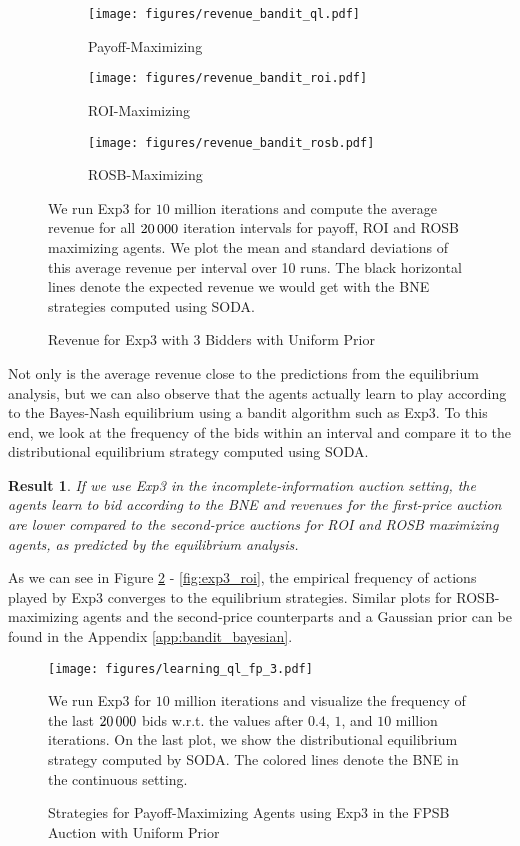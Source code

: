 \documentclass{article}
\newtheorem{result}{Result}
\begin{document}
\begin{figure}[h]
	\begin{center}
		\begin{subfigure}{0.32\textwidth}
			\centering
			\texttt{[image: figures/revenue\_bandit\_ql.pdf]}
			\caption{Payoff-Maximizing}
		\end{subfigure}
		\begin{subfigure}{0.32\textwidth}
			\centering
			\texttt{[image: figures/revenue\_bandit\_roi.pdf]}
			\caption{ROI-Maximizing}
		\end{subfigure}
		\begin{subfigure}{0.32\textwidth}
			\centering
			\texttt{[image: figures/revenue\_bandit\_rosb.pdf]}
			\caption{ROSB-Maximizing}
		\end{subfigure}
		\caption{Revenue for Exp3 with 3 Bidders with Uniform Prior}
		\label{fig:exp3_incomplete}
	\end{center}
	\footnotesize
	We run Exp3 for $10$ million iterations and compute the average revenue for all $20\thinspace000$ iteration intervals for payoff, ROI and ROSB maximizing agents. We plot the mean and standard deviations of this average revenue per interval over 10 runs. The black horizontal lines denote the expected revenue we would get with the BNE strategies computed using SODA.
\end{figure}

Not only is the average revenue close to the predictions from the equilibrium analysis, but we can also observe that the agents actually learn to play according to the Bayes-Nash equilibrium using a bandit algorithm such as Exp3. 
To this end, we look at the frequency of the bids within an interval and compare it to the distributional equilibrium strategy computed using SODA. 
\begin{result}
	If we use Exp3 in the incomplete-information auction setting, the agents learn to bid according to the BNE and revenues for the first-price auction are lower compared to the second-price auctions for ROI and ROSB maximizing agents, as predicted by the equilibrium analysis.
\end{result}
As we can see in Figure \ref{fig:exp3_ql} - \ref{fig:exp3_roi}, the empirical frequency of actions played by Exp3 converges to the equilibrium strategies. Similar plots for ROSB-maximizing agents and the second-price counterparts and a Gaussian prior can be found in the Appendix \ref{app:bandit_bayesian}.

\begin{figure}[h]
	\begin{center}
	\texttt{[image: figures/learning\_ql\_fp\_3.pdf]}
	\caption{Strategies for Payoff-Maximizing Agents using Exp3 in the FPSB Auction with Uniform Prior}
	\label{fig:exp3_ql}
	\end{center}
	\footnotesize
	We run Exp3 for $10$ million iterations and visualize the frequency of the last $20\thinspace000$ bids w.r.t. the values after $0.4$, $1$, and $10$ million iterations. On the last plot, we show the distributional equilibrium strategy computed by SODA. The colored lines denote the BNE in the continuous setting.
\end{figure}
\end{document}
